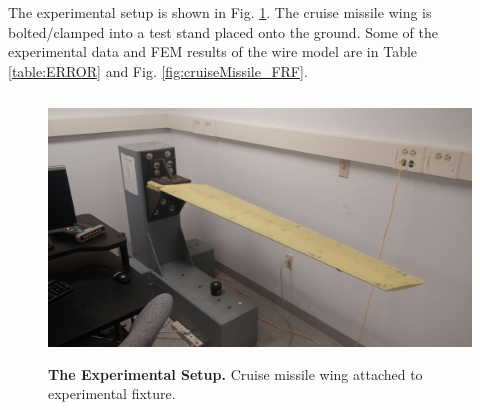 \documentclass[paper=a4, fontsize=12pt]{scrartcl} %
\begin{document}
%
The experimental setup is shown in Fig. \ref{fig:cruiseMissile_setup}. The cruise missile wing is bolted/clamped into a test stand placed onto the ground. Some of the experimental data and FEM results of the wire model are in Table \ref{table:ERROR} and Fig. \ref{fig:cruiseMissile_FRF}.
%
\begin{figure}[H]
	\centering
	\includegraphics[height = 7.0cm]{Pictures/expSetUp.jpg}
	\caption{\textbf{The Experimental Setup.} Cruise missile wing attached to experimental fixture. } 
	\label{fig:cruiseMissile_setup}
\end{figure}
%
\end{document}
